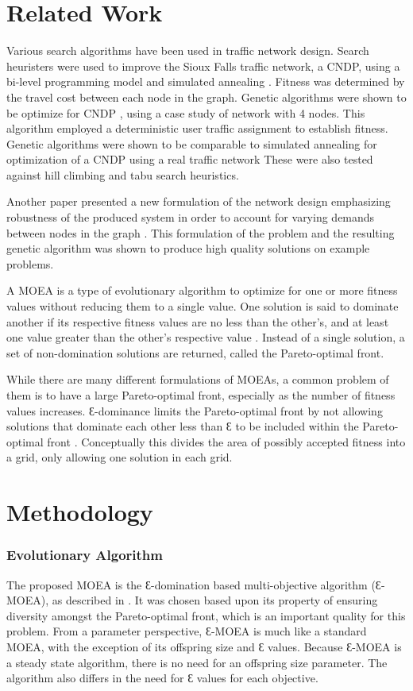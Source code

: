 \documentclass[11pt, oneside, notitlepage, final]{article}
\begin{document}
\part{Related Work}
    Various search algorithms have been used in traffic network design.  Search heuristers were used to  improve the Sioux Falls traffic network, a CNDP, using a bi-level programming model and simulated annealing \cite{1}. Fitness was determined by the travel cost between each node in the graph. Genetic algorithms were shown to be optimize for CNDP \cite{4}, using a case study of network with 4 nodes. This algorithm employed a deterministic user traffic assignment to establish fitness.  Genetic algorithms were shown to be comparable to simulated annealing for optimization of a CNDP using a real traffic network \cite{2} These were also tested against hill climbing and tabu search heuristics.

    Another paper presented a new formulation of the network design emphasizing robustness of the produced system in order to account for varying demands between nodes in the graph \cite{3}. This formulation of the problem and the resulting genetic algorithm was shown to produce high quality solutions on example problems.

    A MOEA is a type of evolutionary algorithm to optimize for one or more fitness values without reducing them to a single value. One solution is said to dominate another if its respective fitness values are no less than the other's, and at least one value greater than the other's respective value \cite{12}. Instead of a single solution, a set of non-domination solutions are returned, called the Pareto-optimal front.

    While there are many different formulations of MOEAs, a common problem of them is to have a large Pareto-optimal front, especially as the number of fitness values increases. Ɛ-dominance limits the Pareto-optimal front by not allowing solutions that dominate each other less than Ɛ to be included within the Pareto-optimal front \cite{11}. Conceptually this divides the area of possibly accepted fitness into a grid, only allowing one solution in each grid.
\part{Methodology}
    \section{Evolutionary Algorithm}
        The proposed MOEA is the Ɛ-domination based multi-objective algorithm (Ɛ-MOEA), as described in \cite{10}. It was chosen based upon its property of ensuring diversity amongst the Pareto-optimal front, which is an important quality for this problem. From a parameter perspective, Ɛ-MOEA is much like a standard MOEA, with the exception of its offspring size and Ɛ values. Because Ɛ-MOEA is a steady state algorithm, there is no need for an offspring size parameter. The algorithm also differs in the need for Ɛ values for each objective.
\end{document}
